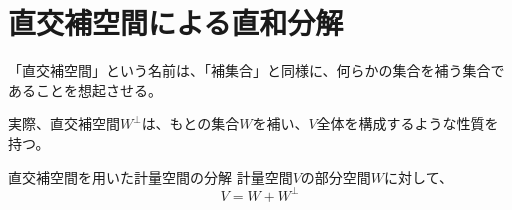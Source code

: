 \documentclass[../../../topic_linear-algebra]{subfiles}
\begin{document}
\sectionline
\section{直交補空間による直和分解}

「直交補空間」という名前は、「補集合」と同様に、何らかの集合を補う集合であることを想起させる。

実際、直交補空間$W^\perp$は、もとの集合$W$を補い、$V$全体を構成するような性質を持つ。

\br

\begin{theorem*}{直交補空間を用いた計量空間の分解}
  計量空間$V$の部分空間$W$に対して、
  \begin{equation*}
    V = W + W^\perp
  \end{equation*}
\end{theorem*}
\end{document}
